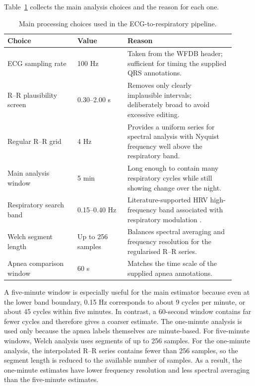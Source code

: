 \documentclass[a4paper,10.5pt,oneside]{report}
\begin{document}
Table~\ref{tab:choices} collects the main analysis choices and the reason for
each one.

\begin{table}[H]
\centering
\caption{Main processing choices used in the ECG-to-respiratory pipeline.}
\label{tab:choices}
\begin{tabular}{p{0.28\linewidth} p{0.20\linewidth} p{0.43\linewidth}}
\toprule
Choice & Value & Reason \\
\midrule
ECG sampling rate & 100 Hz & Taken from the WFDB header; sufficient for timing the supplied QRS annotations. \\
R--R plausibility screen & 0.30--2.00 s & Removes only clearly implausible intervals; deliberately broad to avoid excessive editing. \\
Regular R--R grid & 4 Hz & Provides a uniform series for spectral analysis with Nyquist frequency well above the respiratory band. \\
Main analysis window & 5 min & Long enough to contain many respiratory cycles while still showing change over the night. \\
Respiratory search band & 0.15--0.40 Hz & Literature-supported HRV high-frequency band associated with respiratory modulation \citep{taskforce1996}. \\
Welch segment length & Up to 256 samples & Balances spectral averaging and frequency resolution for the regularised R--R series. \\
Apnea comparison window & 60 s & Matches the time scale of the supplied apnea annotations. \\
\bottomrule
\end{tabular}
\end{table}

A five-minute window is especially useful for the main estimator because even
at the lower band boundary, 0.15 Hz corresponds to about 9 cycles per minute,
or about 45 cycles within five minutes. In contrast, a 60-second window contains
far fewer cycles and therefore gives a coarser estimate. The one-minute
analysis is used only because the apnea labels themselves are minute-based. For five-minute windows, Welch analysis uses segments of up to 256 samples. For the one-minute analysis, the interpolated R--R series contains fewer than 256 samples, so the segment length is reduced to the available number of samples. As a result, the one-minute estimates have lower frequency resolution and less spectral averaging than the five-minute estimates.
\end{document}
